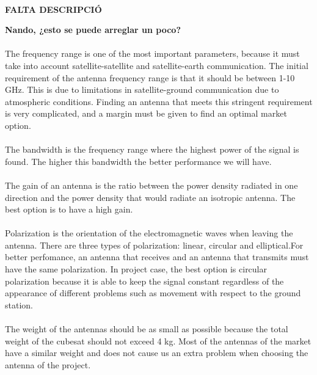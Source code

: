 
\paragraph{} \textbf{FALTA DESCRIPCIÓ}

\textbf{Nando, ¿esto se puede arreglar un poco?}


\paragraph{}
The frequency range is one of the most important parameters, because it must take into account satellite-satellite and satellite-earth communication. The initial requirement of the antenna frequency range is that it should be between 1-10 GHz. This is due to limitations in satellite-ground communication due to atmospheric conditions. Finding an antenna that meets this stringent requirement is very complicated, and a margin must be given to find an optimal market option.

\paragraph{}
The bandwidth is the frequency range where the highest power of the signal is found. The higher this bandwidth the better performance we will have.

\paragraph{}
The gain of an antenna is the ratio between the power density radiated in one direction and the power density that would radiate an isotropic antenna. The best option is to have a high gain. 

\paragraph{}
Polarization is the orientation of the electromagnetic waves when leaving the antenna. There are three types of polarization: linear, circular and elliptical.For better perfomance, an antenna that receives and an antenna that transmits must have the same polarization. In project case, the best option is circular polarization because it is able to keep the signal constant regardless of the appearance of different problems such as movement with respect to the ground station.

\paragraph{} 
The weight of the antennas should be as small as possible because the total weight of the cubesat should not exceed 4 kg. Most of the antennas of the market have a similar weight and does not cause us an extra problem when choosing the antenna of the project.

